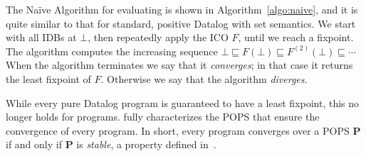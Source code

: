 The Na\"ive Algorithm for evaluating \datalogo is shown in
Algorithm~\ref{algo:naive}, and it is quite similar to that for
standard, positive  Datalog with set semantics.  We start with all IDBs
at $\bot$, then repeatedly apply the ICO $F$, until we reach a
fixpoint.
The algorithm computes the increasing sequence
$\bot \sqsubseteq F(\bot) \sqsubseteq F^{(2)}(\bot)
\sqsubseteq \cdots$ When the algorithm terminates we say that it {\em
  converges}; in that case it returns the least fixpoint of $F$.
Otherwise we say that the algorithm {\em diverges}.

While every pure  Datalog program is guaranteed to have a least
fixpoint, this no longer holds for \datalogo programs.  
\cite{DBLP:conf/pods/Khamis0PSW22} fully characterizes the POPS that ensure
 the convergence of every \datalogo program. 
In short, every \datalogo program converges over a POPS $\bm P$ 
 if and only if $\bm P$ is {\em stable}, a property defined in~\cite{DBLP:conf/pods/Khamis0PSW22}.





